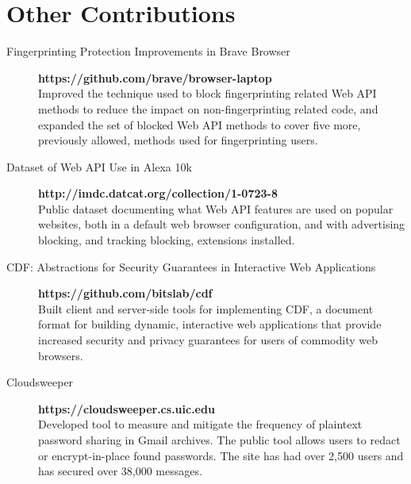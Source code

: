 \documentclass{vitae}
\begin{document}
  \section{Other Contributions}
  \begin{description}

    \item[Fingerprinting Protection Improvements in Brave Browser] \hfill \textbf{https://github.com/brave/browser-laptop}\\
    Improved the technique used to block fingerprinting related Web API methods
    to reduce the impact on non-fingerprinting related code, and expanded the set
    of blocked Web API methods to cover five more, previously allowed, methods used for fingerprinting users. 

    \item[Dataset of Web API Use in Alexa 10k] \hfill \textbf{http://imdc.datcat.org/collection/1-0723-8}\\
    Public dataset documenting what Web API features are used
    on popular websites, both in a default web browser configuration, and with
    advertising blocking, and tracking blocking, extensions installed.

    \item[CDF: Abstractions for Security Guarantees in Interactive Web Applications] \hfill \textbf{https://github.com/bitslab/cdf}\\
    Built client and server-side tools for implementing CDF, a document format for building dynamic, interactive web applications
    that provide increased security and privacy guarantees for users of commodity web browsers.

    \item[Cloudsweeper] \hfill \textbf{https://cloudsweeper.cs.uic.edu}\\
    Developed tool to measure and mitigate the frequency of plaintext password sharing in Gmail archives. The public
    tool allows users to redact or encrypt-in-place found passwords. The site has had over 2,500 users and has
    secured over 38,000 messages.
  \end{description}
\end{document}
